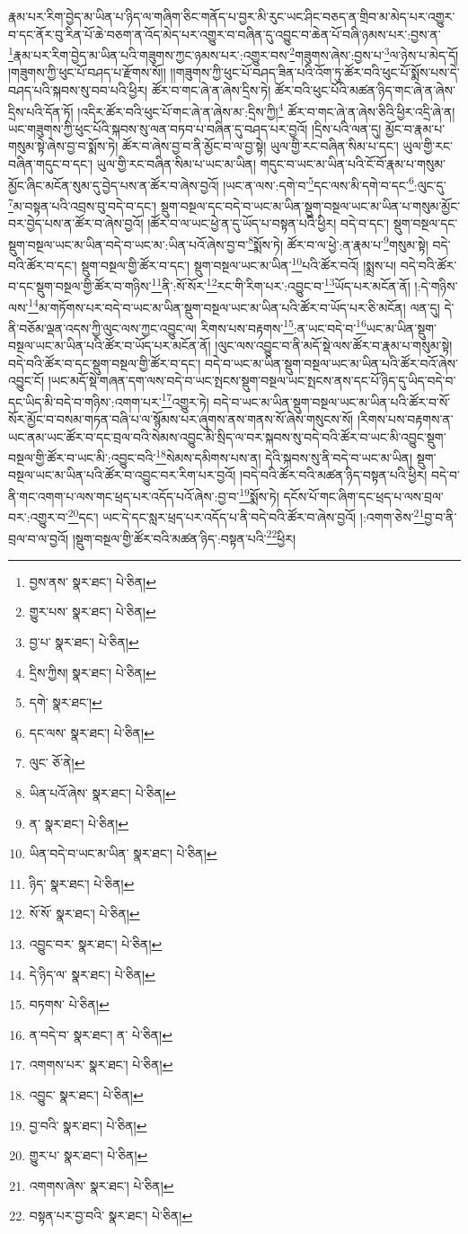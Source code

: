 རྣམ་པར་རིག་བྱེད་མ་ཡིན་པ་ཉིད་ལ་གཞིག་ཅིང་གནོད་པ་བྱར་མི་རུང་ཡང་ཤིང་བཅད་ན་གྲིབ་མ་མེད་པར་འགྱུར་བ་དང་ནོར་བུ་རིན་པོ་ཆེ་བཅག་ན་འོད་མེད་པར་འགྱུར་བ་བཞིན་དུ་འབྱུང་བ་ཆེན་པོ་བཞི་ཉམས་པར་:བྱས་ན་\footnote{བྱས་ནས་  སྣར་ཐང་།  པེ་ཅིན། }རྣམ་པར་རིག་བྱེད་མ་ཡིན་པའི་གཟུགས་ཀྱང་ཉམས་པར་:འགྱུར་བས་\footnote{གྱུར་པས་  སྣར་ཐང་།  པེ་ཅིན། }གཟུགས་ཞེས་:བྱས་པ་\footnote{བྱ་པ་  སྣར་ཐང་།  པེ་ཅིན། }ལ་ཉེས་པ་མེད་དོ། །གཟུགས་ཀྱི་ཕུང་པོ་བཤད་པ་རྫོགས་སོ།། །།གཟུགས་ཀྱི་ཕུང་པོ་བཤད་ཟིན་པའི་འོག་ཏུ་ཚོར་བའི་ཕུང་པོ་སྨོས་པས་དེ་བཤད་པའི་སྐབས་སུ་བབ་པའི་ཕྱིར། ཚོར་བ་གང་ཞེ་ན་ཞེས་དྲིས་ཏེ། ཚོར་བའི་ཕུང་པོའི་མཚན་ཉིད་གང་ཞེ་ན་ཞེས་དྲིས་པའི་དོན་ཏོ། །འདིར་ཚོར་བའི་ཕུང་པོ་གང་ཞེ་ན་ཞེས་མ་:དྲིས་ཀྱི།\footnote{དྲིས་ཀྱིས།  སྣར་ཐང་།  པེ་ཅིན། } ཚོར་བ་གང་ཞེ་ན་ཞེས་ཅིའི་ཕྱིར་འདྲི་ཞེ་ན། ཡང་གཟུགས་ཀྱི་ཕུང་པོའི་སྐབས་སུ་ལན་བཏབ་པ་བཞིན་དུ་བཤད་པར་བྱའོ། །དྲིས་པའི་ལན་དུ། མྱོང་བ་རྣམ་པ་གསུམ་སྟེ་ཞེས་བྱ་བ་སྨོས་ཏེ། ཚོར་བ་ཞེས་བྱ་བ་ནི་མྱོང་བ་ལ་བྱ་སྟེ། ཡུལ་གྱི་རང་བཞིན་སིམ་པ་དང་། ཡུལ་གྱི་རང་བཞིན་གདུང་བ་དང་། ཡུལ་གྱི་རང་བཞིན་སིམ་པ་ཡང་མ་ཡིན། གདུང་བ་ཡང་མ་ཡིན་པའི་ངོ་བོ་རྣམ་པ་གསུམ་མྱོང་ཞིང་མངོན་སུམ་དུ་བྱེད་པས་ན་ཚོར་བ་ཞེས་བྱའོ། །ཡང་ན་ལས་:དགེ་བ་\footnote{དགེ་  སྣར་ཐང་། }དང་ལས་མི་དགེ་བ་དང་\footnote{དང་ལས་  སྣར་ཐང་།  པེ་ཅིན། }:ལུང་དུ་\footnote{ལུང་  ཅོ་ནེ། }མ་བསྟན་པའི་འབྲས་བུ་བདེ་བ་དང་། སྡུག་བསྔལ་དང་བདེ་བ་ཡང་མ་ཡིན་སྡུག་བསྔལ་ཡང་མ་ཡིན་པ་གསུམ་མྱོང་བར་བྱེད་པས་ན་ཚོར་བ་ཞེས་བྱའོ། །ཚོར་བ་ལ་ཡང་ཕྱེ་ན་དུ་ཡོད་པ་བསྟན་པའི་ཕྱིར། བདེ་བ་དང་། སྡུག་བསྔལ་དང་སྡུག་བསྔལ་ཡང་མ་ཡིན་བདེ་བ་ཡང་མ་:ཡིན་པའོ་ཞེས་བྱ་བ་\footnote{ཡིན་པའོ་ཞེས་  སྣར་ཐང་།  པེ་ཅིན། }སྨོས་ཏེ། ཚོར་བ་ལ་ཕྱེ་:ན་རྣམ་པ་\footnote{ན་  སྣར་ཐང་།  པེ་ཅིན། }གསུམ་སྟེ། བདེ་བའི་ཚོར་བ་དང་། སྡུག་བསྔལ་གྱི་ཚོར་བ་དང་། སྡུག་བསྔལ་ཡང་མ་ཡིན་\footnote{ཡིན་བདེ་བ་ཡང་མ་ཡིན་  སྣར་ཐང་།  པེ་ཅིན། }པའི་ཚོར་བའོ། །སྨྲས་པ། བདེ་བའི་ཚོར་བ་དང་སྡུག་བསྔལ་གྱི་ཚོར་བ་གཉིས་\footnote{ཉིད་  སྣར་ཐང་།  པེ་ཅིན། }ནི་:སོ་སོར་\footnote{སོ་སོ་  སྣར་ཐང་།  པེ་ཅིན། }རང་གི་རིག་པར་:འབྱུང་བ་\footnote{འབྱུང་བར་  སྣར་ཐང་།  པེ་ཅིན། }ཡོད་པར་མངོན་ནོ། །:དེ་གཉིས་ལས་\footnote{དེ་ཉིད་ལ་  སྣར་ཐང་།  པེ་ཅིན། }མ་གཏོགས་པར་བདེ་བ་ཡང་མ་ཡིན་སྡུག་བསྔལ་ཡང་མ་ཡིན་པའི་ཚོར་བ་ཡོད་པར་ཅི་མངོན། ལན་དུ། དེ་ནི་བཅོམ་ལྡན་འདས་ཀྱི་ལུང་ལས་ཀྱང་འབྱུང་ལ། རིགས་པས་བརྟགས་\footnote{བཏགས་  པེ་ཅིན། }:ན་ཡང་བདེ་བ་\footnote{ན་བདེ་བ་  སྣར་ཐང་། ན་  པེ་ཅིན། }ཡང་མ་ཡིན་སྡུག་བསྔལ་ཡང་མ་ཡིན་པའི་ཚོར་བ་ཡོད་པར་མངོན་ནོ། །ལུང་ལས་འབྱུང་བ་ནི་མདོ་སྡེ་ལས་ཚོར་བ་རྣམ་པ་གསུམ་སྟེ། བདེ་བའི་ཚོར་བ་དང་སྡུག་བསྔལ་གྱི་ཚོར་བ་དང་། བདེ་བ་ཡང་མ་ཡིན་སྡུག་བསྔལ་ཡང་མ་ཡིན་པའི་ཚོར་བའོ་ཞེས་འབྱུང་ངོ། །ཡང་མདོ་སྡེ་གཞན་དག་ལས་བདེ་བ་ཡང་སྤངས་སྡུག་བསྔལ་ཡང་སྤངས་ནས་དང་པོ་ཉིད་དུ་ཡིད་བདེ་བ་དང་ཡིད་མི་བདེ་བ་གཉིས་:འགག་པར་\footnote{འགགས་པར་  སྣར་ཐང་།  པེ་ཅིན། }འགྱུར་ཏེ། བདེ་བ་ཡང་མ་ཡིན་སྡུག་བསྔལ་ཡང་མ་ཡིན་པའི་ཚོར་བ་སོ་སོར་མྱོང་བ་བསམ་གཏན་བཞི་པ་ལ་སྙོམས་པར་ཞུགས་ནས་གནས་སོ་ཞེས་གསུངས་སོ། །རིགས་པས་བརྟགས་ན་ཡང་ནམ་ཡང་ཚོར་བ་དང་བྲལ་བའི་སེམས་འབྱུང་མི་སྲིད་ལ་བར་སྐབས་སུ་བདེ་བའི་ཚོར་བ་ཡང་མི་འབྱུང་སྡུག་བསྔལ་གྱི་ཚོར་བ་ཡང་མི་:འབྱུང་བའི་\footnote{འབྱུང་  སྣར་ཐང་།  པེ་ཅིན། }སེམས་དམིགས་པས་ན། དེའི་སྐབས་སུ་ནི་བདེ་བ་ཡང་མ་ཡིན། སྡུག་བསྔལ་ཡང་མ་ཡིན་པའི་ཚོར་བ་འབྱུང་བར་རིག་པར་བྱའོ། །བདེ་བའི་ཚོར་བའི་མཚན་ཉིད་བསྟན་པའི་ཕྱིར། བདེ་བ་ནི་གང་འགག་པ་ལས་གང་ཕྲད་པར་འདོད་པའོ་ཞེས་:བྱ་བ་\footnote{བྱ་བའི་  སྣར་ཐང་།  པེ་ཅིན། }སྨོས་ཏེ། དངོས་པོ་གང་ཞིག་དང་ཕྲད་པ་ལས་བྲལ་བར་:འགྱུར་བ་\footnote{གྱུར་པ་  སྣར་ཐང་།  པེ་ཅིན། }དང་། ཡང་དེ་དང་སླར་ཕྲད་པར་འདོད་པ་ནི་བདེ་བའི་ཚོར་བ་ཞེས་བྱའོ། །:འགག་ཅེས་\footnote{འགགས་ཞེས་  སྣར་ཐང་།  པེ་ཅིན། }བྱ་བ་ནི་བྲལ་བ་ལ་བྱའོ། །སྡུག་བསྔལ་གྱི་ཚོར་བའི་མཚན་ཉིད་:བསྟན་པའི་\footnote{བསྟན་པར་བྱ་བའི་  སྣར་ཐང་།  པེ་ཅིན། }ཕྱིར། 